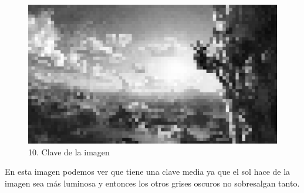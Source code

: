 \documentclass[12pt]{article}
\begin{document}
    \begin{figure}[H]
      \centering
      \includegraphics[width=\textwidth]{images/Selena/10 pixelada.png}
      \caption{\small 10. Clave de la imagen}
    \end{figure}
    En esta imagen podemos ver que tiene una clave media ya que el sol hace de la imagen sea más luminosa y entonces los otros grises oscuros no sobresalgan tanto.
\end{document}
